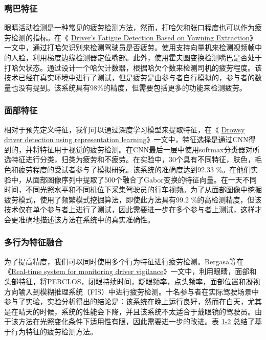 \subsubsection{嘴巴特征}

眼睛活动检测是一种常见的疲劳检测方法，然而，打哈欠和张口程度也可以作为疲劳检测的指标。在《
\href{https://xueshu.baidu.com/usercenter/paper/show?paperid=fd12f51013020b4d8efeeb3666104ff6&site=xueshu_se}{Driver's Fatigue Detection Based on Yawning Extraction}》 一文中，通过打哈欠识别来检测驾驶员是否疲劳。使用支持向量机来检测视频帧中的人脸，利用梯度边缘检测器定位嘴部。此外，使用霍夫圆变换检测嘴巴是否处于打哈欠状态。通过设计一个哈欠计数器，根据哈欠个数来检测司机的疲劳程度。该技术已经在真实环境中进行了测试，但是疲劳是由参与者自行模拟的，参与者的数量也没有提到。该系统具有98$\%$的精度，但需要包括更多的功能来检测疲劳。

\subsubsection{面部特征}

相对于预先定义特征，我们可以通过深度学习模型来提取特征，在《
\href{https://xueshu.baidu.com/usercenter/paper/show?paperid=a9b574549a36e94db6af2b728361eee9&site=xueshu_se&hitarticle=1}{Drowsy driver detection using representation learning}》一文中，特征选择是通过CNN得到的，并将特征用于视觉的疲劳检测。在CNN最后一层中使用softmax分类器对所选特征进行分类，归类为疲劳和不疲劳。在实验中，30个具有不同特征，肤色，毛色和疲劳程度的受试者参与了模拟研究。该系统的准确度达到92.33 $\%$。在他们实验中，从面部图像序列中提取了500个融合了Gabor变换的特征向量。在一天不同时间，不同光照水平和不同机位下采集驾驶员的行车视频。为了从面部图像中挖掘疲劳模式，使用了频繁模式挖掘算法，即使此方法具有99.2 $\%$的高检测精度，但该技术仅在单个参与者上进行了测试，因此需要进一步在多个参与者上测试，这样才会更准确地描述该方法在系统中的真实准确性。

\subsubsection{多行为特征融合}

为了提高精度，我们可以同时使用多个行为特征进行疲劳检测。Bergasa等在《\href{https://xueshu.baidu.com/usercenter/paper/show?paperid=878001d7c60796581b6cfcecaf6c59e5&site=xueshu_se}{Real-time system for monitoring driver vigilance}》一文中，利用眼睛，面部和头部特征，将PERCLOS，闭眼持续时间，眨眼频率，点头频率，面部位置和凝视方向输入到模糊推理系统（FIS）中进行疲劳检测。十名参与者在实际驾驶场景中参与了实验，实验分析得出的结论是：该系统在晚上运行良好，然而在白天，尤其是在晴天的时候，系统的性能会下降，并且该系统不太适合于戴眼镜的驾驶员。由于该方法在光照变化条件下适用性有限，因此需要进一步的改进。表
\href{table:1-2}{1-2} 总结了基于行为特征的疲劳检测方法。

